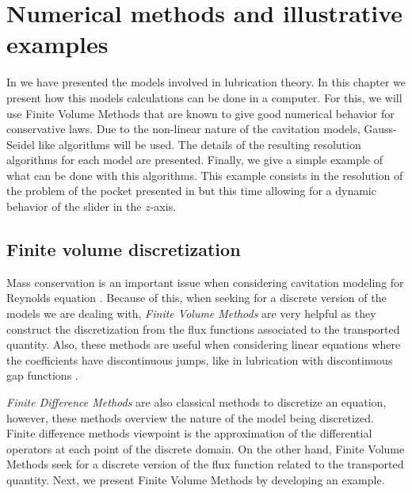 \chapter{Numerical methods and illustrative examples}
\label{chap:numerical_methods}
In  we have presented the models involved in lubrication theory. In this chapter we present how this models calculations can be done in a computer. For this, we will use Finite Volume Methods that are known to give good numerical behavior for conservative laws. Due to the non-linear nature of the cavitation models, Gauss-Seidel like
algorithms will be used. The details of the resulting resolution algorithms for each model are presented. Finally, we give a simple example of what can be done with this algorithms. This example consists in the resolution of the problem of the pocket presented in  but this time allowing for a dynamic behavior of the slider in the $z$-axis.
\section{Finite volume discretization}
Mass conservation is an important issue when considering cavitation modeling for \\Reynolds equation \cite{ausas07,qiu2009}. Because of this, when seeking for a discrete version of the models we are dealing with, \emph{Finite Volume Methods} are very helpful as they construct the discretization from the flux functions associated to the transported quantity. Also, these methods are useful when considering linear equations where the coefficients have discontinuous jumps, like in lubrication with discontinuous gap functions \cite{leveque2002}.

\textit{Finite Difference Methods} are also classical methods to discretize an equation, however, these methods overview the nature of the model being discretized. Finite difference methods viewpoint is the approximation of the differential operators at each point of the discrete domain. On the other hand, Finite Volume Methods seek for a discrete version of the flux function related to the transported quantity. Next, we present Finite Volume Methods by developing an example.


